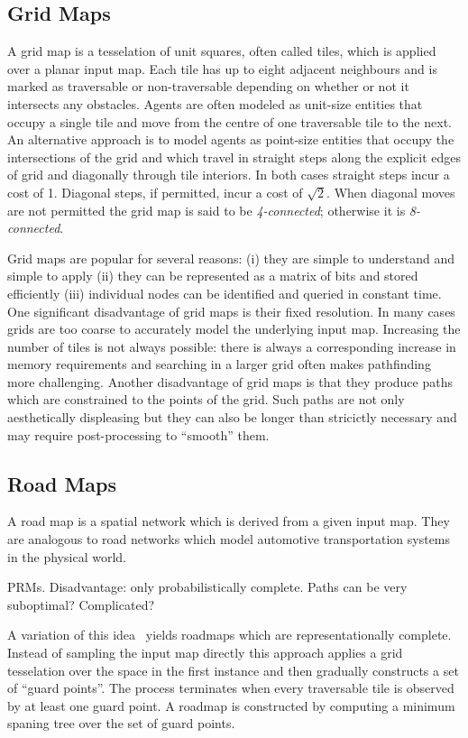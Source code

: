 \subsection{Grid Maps}
\label{cha::lit::graphs::grid}
A grid map is a tesselation of unit squares, often called tiles, which is
applied over a planar input map. Each tile has up to eight adjacent neighbours
and is marked as traversable or non-traversable depending on whether or not it
intersects any obstacles.  Agents are often modeled as unit-size entities that
occupy a single tile and move from the centre of one traversable tile to the
next.  
An alternative approach is to model agents as point-size entities that occupy 
the intersections of the grid and which travel in straight steps along the
explicit edges of grid and diagonally through tile interiors.
In both cases straight steps incur a cost of 1. Diagonal steps, if permitted, 
incur a cost of $\sqrt{2}$.  When diagonal moves are not permitted the grid map 
is said to be \emph{4-connected}; otherwise it is \emph{8-connected}.  

Grid maps are popular for several reasons: (i) they are simple to understand 
and simple to apply (ii) they can be represented as a matrix of bits and stored
efficiently (iii) individual nodes can be identified and queried in constant time.
One significant disadvantage of grid maps is their fixed resolution. In many cases 
grids are too coarse to accurately model the underlying input map. Increasing the
number of tiles is not always possible: there is always a corresponding increase in
memory requirements and searching in a larger grid often makes pathfinding more 
challenging.
Another disadvantage of grid maps is that they produce paths which are
constrained to the points of the grid. Such paths are not only aesthetically
displeasing but they can also be longer than stricictly necessary and may
require post-processing to ``smooth'' them.

\subsection{Road Maps}
\label{cha::lit::graphs::road}
A road map is a spatial network which is derived from a given input map. 
They are analogous to road networks which model automotive transportation systems 
in the physical world.

PRMs.
Disadvantage: only probabilistically complete. Paths can be very suboptimal? Complicated?

A variation of this idea~\citep{geraerts05} yields roadmaps which are representationally complete.
Instead of sampling the input map directly this approach applies a grid tesselation over the
space in the first instance  and then gradually constructs a set of ``guard points''. The process
terminates when every traversable tile is observed by at least one guard point. A roadmap is constructed
by computing a minimum spaning tree over the set of guard points. 

